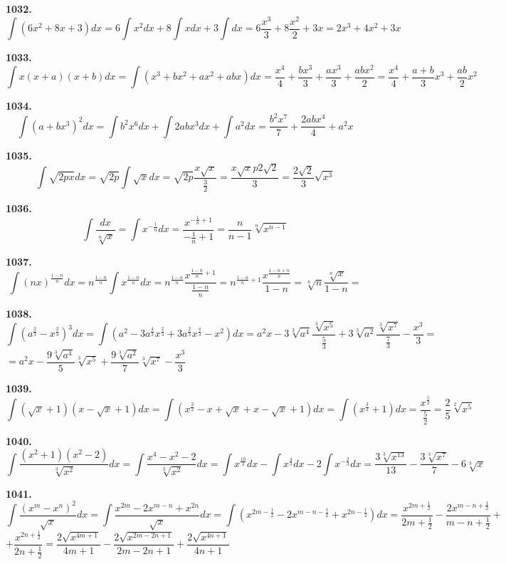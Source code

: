 \documentclass[12pt]{article}
\begin{document}
	{\bf 1032.} \[
		\int(6x^2+8x+3)dx = 6\int x^2dx +8\int x dx +3\int dx = 6\dfrac{x^3}{3} +8\dfrac{x^2}{2}+3x = 2x^3+4x^2+3x 
	\]
	
	{\bf 1033.} \[
		\int x(x+a)(x+b)dx = \int (x^3+bx^2+ax^2+abx)dx = \dfrac{x^4}{4}+\dfrac{bx^3}{3}+\dfrac{ax^3}{3}+\dfrac{abx^2}{2} = \dfrac{x^4}{4}+\dfrac{a+b}{3}x^3 +\dfrac{ab}{2}x^2
	\]
	
	{\bf 1034.} \[
		\int(a+bx^3)^2dx = \int b^2x^6 dx +\int 2abx^3 dx +\int a^2dx = \dfrac{b^2 x^7}{7} +\dfrac{2ab x^4}{4} + a^2x
	\]
	
	{\bf 1035.} \[
		\int \sqrt{2px} dx = \sqrt{2p} \int \sqrt{x}dx = \sqrt{2p} \dfrac{x\sqrt{x}}{\frac{3}{2}} = \dfrac{x\sqrt{x}p 2\sqrt{2}}{3} = \dfrac{2\sqrt{2}}{3}\sqrt{x^3}
	\]
	
	{\bf 1036.}\[
		\int \dfrac{dx}{\sqrt[n]{x}} = \int x^{-\frac{1}{n}}dx = \dfrac{x^{-\frac{1}{n}+1}}{-\frac{1}{n}+1} = \dfrac{n}{n-1}\sqrt[n]{x^{n-1}}
	\]
	
	{\bf 1037.}\[
		\int (nx)^{\frac{1-n}{n}}dx = n^{\frac{1-n}{n}}\int x^{\frac{1-n}{n}}dx = n^{\frac{1-n}{n}} \dfrac{x^{\frac{1-n}{n}+1}}{\frac{1-n}{n}} = n^{\frac{1-n}{n}+1}\dfrac{x^{\frac{1-n+n}{n}}}{1-n} = \sqrt[n]{n} \dfrac{\sqrt[n]{x}}{1-n} = 
	\]
	
	{\bf 1038.} \[
		\int \left(a^{\frac{2}{3}}-x^{\frac{2}{3}}\right)^3dx = \int (a^2-3a^\frac{4}{3}x^\frac{2}{3}+3a^{\frac{2}{3}}x^{\frac{4}{3}}-x^2)dx = a^2x - 3\sqrt[3]{a^4}\dfrac{\sqrt[3]{x^5}}{\frac{5}{3}} + 3\sqrt[3]{a^2}\dfrac{\sqrt[3]{x^7}}{\frac{7}{3}}-\dfrac{x^3}{3} =
	\]
	\quad$= a^2x-\dfrac{9\sqrt[3]{a^4}}{5}\sqrt[3]{x^5} +\dfrac{9\sqrt[3]{a^2}}{7}\sqrt[3]{x^7} -\dfrac{x^3}{3}$
	
	\vspace{2mm}
	
	{\bf 1039.}\[
		\int (\sqrt{x}+1)(x-\sqrt{x}+1)dx = \int (x^\frac{3}{2}-x+\sqrt{x}+x-\sqrt{x}+1)dx = \int (x^\frac{3}{2}+1)dx = \dfrac{x^\frac{5}{2}}{\frac{5}{2}} = \dfrac{2}{5}\sqrt[2]{x^5}
	\]
	
	{\bf 1040.}\[
		\int \dfrac{(x^2+1)(x^2-2)}{\sqrt[3]{x^2}}dx = \int \dfrac{x^4-x^2-2}{\sqrt[3]{x^2}}dx = \int x^\frac{10}{3}dx - \int x^\frac{4}{3}dx - 2\int x^{-\frac{2}{3}}dx = \dfrac{3\sqrt[3]{x^{13}}}{13} - \dfrac{3\sqrt[3]{x^7}}{7} -6\sqrt[3]{x}
	\]
	
	{\bf 1041.}\[
		\int\dfrac{(x^m-x^n)^2}{\sqrt{x}}dx = \int \dfrac{x^{2m}-2x^{m-n}+x^{2n}}{\sqrt{x}}dx = \int( x^{2m-\frac{1}{2}} -2x^{m-n-\frac{1}{2}} +x^{2n-\frac{1}{2}})dx = \dfrac{x^{2m+\frac{1}{2}}}{2m+\frac{1}{2}}-\dfrac{2x^{m-n+\frac{1}{2}}}{m-n+\frac{1}{2}} +
	\]
	$
	+\dfrac{x^{2n+\frac{1}{2}}}{2n+\frac{1}{2}} = \dfrac{2\sqrt{x^{4m+1}}}{4m+1} - \dfrac{2\sqrt{x^{2m-2n+1}}}{2m-2n+1} + \dfrac{2\sqrt{x^{4n+1}}}{4n+1}
	$
	
\end{document}
